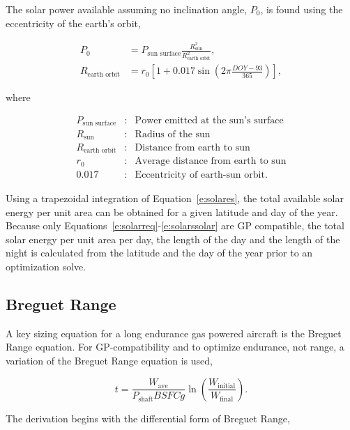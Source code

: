\documentclass[]{aiaa-tc}%
\begin{document}
    The solar power available assuming no inclination angle, $P_0$, is found using the eccentricity of the earth's orbit, 

    \begin{align}
        \label{e:solarp0}
        P_0 & = P_{\text{sun surface}} \frac{R_{\text{sun}}^2}{R_{\text{earth orbit}}^2}, \\
        \label{e:solareo}
        R_{\text{earth orbit}} & = r_0 \left[ 1 + 0.017 \sin{\left( 2\pi \frac{DOY-93}{365}\right)} \right],
    \end{align}
    
    where 

    \[ \begin{array}{lcl}
        P_{\text{sun surface}} & : & \text{Power emitted at the sun's surface} \\
        R_{\text{sun}} & : & \text{Radius of the sun} \\
        R_{\text{earth orbit}} & : & \text{Distance from earth to sun} \\
        r_0 & : & \text{Average distance from earth to sun} \\
        0.017 & : & \text{Eccentricity of earth-sun orbit}.
    \end{array} \]

    Using a trapezoidal integration of Equation~\ref{e:solares}, the total available solar energy per unit area can be obtained for a given latitude and day of the year. Because only Equations~\ref{e:solarreq}-\ref{e:solarssolar} are GP compatible, the total solar energy per unit area per day, the length of the day and the length of the night is calculated from the latitude and the day of the year prior to an optimization solve.

\subsection{Breguet Range}

A key sizing equation for a long endurance gas powered aircraft is the Breguet Range equation.  
For GP-compatibility and to optimize endurance, not range, a variation of the Breguet Range equation is used, 

\begin{equation}
    \label{e:breguetendurance}
    t = \frac{W_{\text{ave}}}{P_{\text{shaft}}BSFCg} \ln{\left( \frac{W_{\text{initial}}}{W_{\text{final}}}\right)}.
\end{equation}

The derivation begins with the differential form of Breguet Range,\cite{br2}
\end{document}
